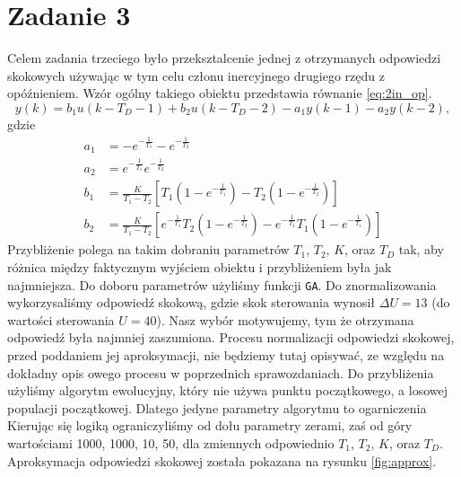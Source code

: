 \chapter{Zadanie 3}
Celem zadania trzeciego było przeksztalcenie jednej z otrzymanych odpowiedzi skokowych używając w tym celu
członu inercyjnego drugiego rzędu z opóźnieniem. Wzór ogólny takiego obiektu przedstawia równanie \ref{eq:2in_op}.
\begin{equation}
  \label{eq:2in_op}
  y(k) = b_1u(k-T_D-1) + b_2u(k-T_D-2)-a_1y(k-1)-a_2y(k-2),
\end{equation}
gdzie
\begin{align}
  a_1 &= -e^{-\frac{1}{T_1}}-e^{-\frac{1}{T_2}} \nonumber \\
  a_2 &= e^{-\frac{1}{T_1}}e^{-\frac{1}{T_2}} \nonumber \\
  b_1 &= \frac{K}{T_1 - T_2}[T_1(1 - e^{-\frac{1}{T_1}}) - T_2(1 - e^{-\frac{1}{T_2}})] \nonumber \\
  b_2 &= \frac{K}{T_1 - T_2}[e^{-\frac{1}{T_1}}T_2(1 - e^{-\frac{1}{T_2}}) - e^{-\frac{1}{T_2}}T_1(1 - e^{-\frac{1}{T_1}})]
\end{align}
Przybliżenie polega na takim dobraniu parametrów $T_1$, $T_2$, $K$, oraz $T_D$ tak,
aby różnica między faktycznym wyjściem obiektu i przybliżeniem była jak najmniejsza.
Do doboru parametrów użyliśmy funkcji \texttt{GA}.  Do znormalizowania wykorzysaliśmy odpowiedź
skokową, gdzie skok sterowania wynosił $\Delta U = 13$ (do wartości sterowania $U = 40$). Nasz wybór
motywujemy, tym że otrzymana odpowiedź była najmniej zaszumiona. Procesu normalizacji odpowiedzi skokowej, przed poddaniem
jej aproksymacji, nie będziemy tutaj opisywać, ze względu na dokładny opis owego procesu
w poprzednich sprawozdaniach.
Do przybliżenia użyliśmy algorytm ewolucyjny, który nie używa punktu początkowego,
a losowej populacji początkowej. Dlatego jedyne parametry algorytmu to ogarniczenia
Kierując się logiką ograniczyliśmy od dołu parametry zerami, zaś od góry wartościami 1000, 1000, 10, 50,
dla zmiennych odpowiednio $T_1$, $T_2$, $K$, oraz $T_D$.
Aproksymacja odpowiedzi skokowej została pokazana na rysunku \ref{fig:approx}.

